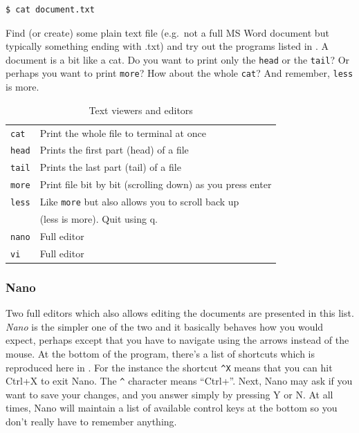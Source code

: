 \begin{verbatim}
$ cat document.txt
\end{verbatim}
Find (or create) some plain text file (e.g.\ not a full MS Word document but typically something ending with .txt) and try out the programs listed in . A document is a bit like a cat. Do you want to print only the \verb|head| or the \verb|tail|? Or perhaps you want to print \verb|more|? How about the whole \verb|cat|? And remember, \verb|less| is more.

\begin{table}
	\centering
	\caption{Text viewers and editors}
	\begin{tabular}{ll}
	\hline
	\verb|cat|		&	Print the whole file to terminal at once 	\\
	\verb|head|		&	Prints the first part (head) of a file \\
	\verb|tail|		&	Prints the last part (tail) of a file	 \\	
	\verb|more|		&	Print file bit by bit (scrolling down) as you press enter	\\
	\verb|less|		&	Like \verb|more| but also allows you to scroll back up\\& (less is more). Quit using q. \\	
	\hline
	\verb|nano|		&	Full editor \\
	\verb|vi|		&	Full editor
	\end{tabular}
	\label{tab:bash:editors}
\end{table}

\subsubsection{Nano}
Two full editors which also allows editing the documents are presented in this list. \emph{Nano} is the simpler one of the two and it basically behaves how you would expect, perhaps except that you have to navigate using the arrows instead of the mouse. At the bottom of the program, there's a list of shortcuts which is reproduced here in . For the instance the shortcut \verb|^X| means that you can hit Ctrl+X to exit Nano. The \verb|^| character means ``Ctrl+''. Next, Nano may ask if you want to save your changes, and you answer simply by pressing Y or N. At all times, Nano will maintain a list of available control keys at the bottom so you don't really have to remember anything.

